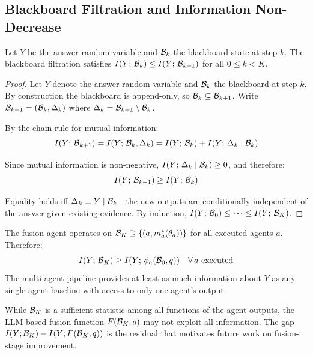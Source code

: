 \subsection{Blackboard Filtration and Information Non-Decrease}
\label{app:thm_info}

\begin{theorem}
\label{thm:info}
Let $Y$ be the answer random variable and $\mathcal{B}_k$ the blackboard state at step $k$.  The blackboard filtration satisfies $I(Y;\, \mathcal{B}_k) \leq I(Y;\, \mathcal{B}_{k+1})$ for all $0 \leq k < K$.
\end{theorem}

\begin{proof}
Let $Y$ denote the answer random variable and $\mathcal{B}_k$ the blackboard at step $k$.  By construction the blackboard is append-only, so $\mathcal{B}_k \subseteq \mathcal{B}_{k+1}$.  Write $\mathcal{B}_{k+1} = (\mathcal{B}_k, \Delta_k)$ where $\Delta_k = \mathcal{B}_{k+1} \setminus \mathcal{B}_k$.

By the chain rule for mutual information:
\begin{equation}
    I(Y;\, \mathcal{B}_{k+1}) = I(Y;\, \mathcal{B}_k, \Delta_k) = I(Y;\, \mathcal{B}_k) + I(Y;\, \Delta_k \mid \mathcal{B}_k)
\end{equation}

Since mutual information is non-negative, $I(Y;\, \Delta_k \mid \mathcal{B}_k) \geq 0$, and therefore:
\begin{equation}
    I(Y;\, \mathcal{B}_{k+1}) \geq I(Y;\, \mathcal{B}_k)
\end{equation}

Equality holds iff $\Delta_k \perp Y \mid \mathcal{B}_k$---the new outputs are conditionally independent of the answer given existing evidence.  By induction, $I(Y;\, \mathcal{B}_0) \leq \cdots \leq I(Y;\, \mathcal{B}_K)$.
\end{proof}

\begin{corollary}
\label{cor:fusion}
The fusion agent operates on $\mathcal{B}_K \supseteq \{(a, m^*_a(\theta_a))\}$ for all executed agents $a$.  Therefore:
\begin{equation}
    I(Y;\, \mathcal{B}_K) \geq I(Y;\, \phi_a(\mathcal{B}_0, q)) \quad \forall\, a \text{ executed}
\end{equation}
The multi-agent pipeline provides at least as much information about $Y$ as any single-agent baseline with access to only one agent's output.
\end{corollary}

\begin{remark}
While $\mathcal{B}_K$ is a sufficient statistic among all functions of the agent outputs, the LLM-based fusion function $F(\mathcal{B}_K, q)$ may not exploit all information.  The gap $I(Y; \mathcal{B}_K) - I(Y; F(\mathcal{B}_K, q))$ is the residual that motivates future work on fusion-stage improvement.
\end{remark}

